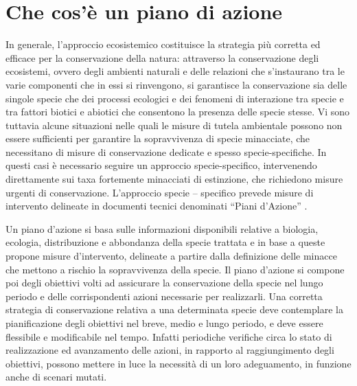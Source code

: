 \documentclass[10pt,twoside,openany,x11names,svgnames,italian,a5paper,dvipsnames,table]{memoir}
\newcommand\chapterillustration{}
\begin{document}
\setlength\afterchapskip{10mm}
\chapter{Che cos'\`e un piano di azione}
\renewcommand\chapterillustration{}
\footnotesize
\vspace{.5cm}
In generale, l'approccio ecosistemico costituisce la strategia più corretta ed efficace per la conservazione della natura: attraverso la conservazione degli ecosistemi, ovvero degli ambienti naturali e delle relazioni che s’instaurano tra le varie componenti che in essi si rinvengono, si garantisce la conservazione sia delle singole specie che dei processi ecologici e dei fenomeni di interazione tra specie e tra fattori biotici e abiotici che consentono la presenza delle specie stesse.
Vi sono tuttavia alcune situazioni nelle quali le misure di tutela ambientale possono non essere sufficienti per garantire la sopravvivenza di specie minacciate, che necessitano di misure di conservazione dedicate e spesso specie-specifiche. In questi casi è necessario seguire un approccio specie-specifico, intervenendo direttamente sui taxa fortemente minacciati di estinzione, che richiedono misure urgenti di conservazione. L’approccio specie – specifico prevede misure di intervento delineate in documenti tecnici denominati “Piani d’Azione” \cite{EUCOUNCIL98}.

Un piano d’azione si basa sulle informazioni disponibili relative a biologia, ecologia, distribuzione e abbondanza della specie trattata e in base a queste propone misure d’intervento, delineate a partire dalla definizione delle minacce che mettono a rischio la sopravvivenza della specie. Il piano d’azione si compone poi degli obiettivi volti ad assicurare la conservazione della specie nel lungo periodo e delle corrispondenti azioni necessarie per realizzarli.
Una corretta strategia di conservazione relativa a una determinata specie deve contemplare la pianificazione degli obiettivi nel breve, medio e lungo periodo, e deve essere flessibile e modificabile nel tempo. Infatti periodiche verifiche circa lo stato di realizzazione ed avanzamento delle azioni, in rapporto al raggiungimento degli obiettivi, possono mettere in luce la necessità di un loro adeguamento, in funzione anche di scenari mutati.
\end{document}
